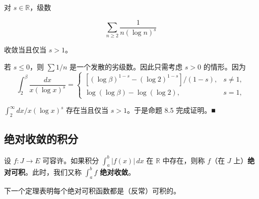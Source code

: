 \begin{example}

对 $ s \in \mathbb{R} $，级数

\[
\sum_{n \ge 2} \frac{1}{n(\log n)^{s}}
\]

收敛当且仅当 $ s > 1 $。

\proofhead
若 $ s \le 0 $，则 $ \sum 1/n $ 是一个发散的劣级数。因此只需考虑 $ s > 0 $ 的情形。因为
\begin{equation*}
\int_{2}^{\beta} \frac{dx}{x(\log x)^{s}} = \begin{cases} \left[ (\log\beta)^{1-s} - (\log 2)^{1-s} \right]/(1 - s) , & s \ne 1 , \\ \log(\log\beta) - \log(\log 2) , & s = 1 , \end{cases}
\end{equation*}

$ \int_{2}^{\infty} dx/x(\log x)^{s} $ 存在当且仅当 $ s > 1 $。于是命题 8.5 完成证明。\nobreak\hspace{0.35em}■

\end{example}

\subsection*{绝对收敛的积分}

设 $ f : J \to E $ 可容许。如果积分 $ \int_{a}^{b} \left| f(x) \right|\,dx $ 在 $ \mathbb{R} $ 中存在，则称 $ f $（在 $ J $ 上）\textbf{绝对可积}。此时，我们又称 $ \int_{a}^{b} f $ \textbf{绝对收敛}。

下一个定理表明每个绝对可积函数都是（反常）可积的。

